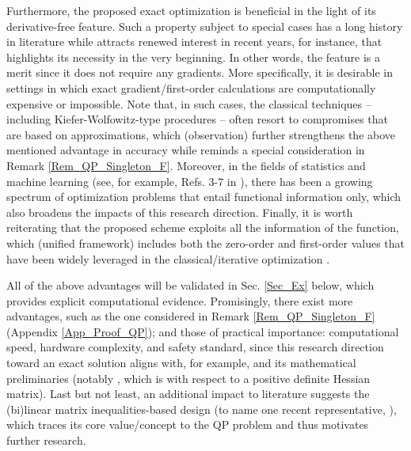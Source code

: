 \documentclass[9pt,twocolumn,twoside,lineno]{pnas-new-1}
\theoremstyle{remark}
\begin{document}
Furthermore, the proposed exact optimization is beneficial in the light of its derivative-free feature. Such a property subject to special cases has a long history in literature while attracts renewed interest in recent years, for instance, \cite{DuJoWaWi:15} that highlights its necessity in the very beginning. In other words, the feature is a merit since it does not require any gradients. More specifically, it is desirable in settings in which exact gradient/first-order calculations are computationally expensive or impossible. Note that, in such cases, the classical techniques -- including Kiefer-Wolfowitz-type procedures \citep{KuYi:03} -- often resort to compromises that are based on approximations, which (observation) further strengthens the above mentioned advantage in accuracy while reminds a special consideration in Remark \ref{Rem_QP_Singleton_F}. Moreover, in the fields of statistics and machine learning (see, for example, Refs. 3-7 in \cite{DuJoWaWi:15}), there has been a growing spectrum of optimization problems that entail functional information only, which also broadens the impacts of this research direction. Finally, it is worth reiterating that the proposed scheme exploits all the information of the function, which (unified framework) includes both the zero-order \citep{DuJoWaWi:15} and first-order values that have been widely leveraged in the classical/iterative optimization \citep{Lu(Ye):03(16),NoWr:06}.

All of the above advantages will be validated in Sec. \ref{Sec_Ex} below, which provides explicit computational evidence. Promisingly, there exist more advantages, such as the one considered in Remark \ref{Rem_QP_Singleton_F} (Appendix \ref{App_Proof_QP}); and those of practical importance: computational speed, hardware complexity, and safety standard, since this research direction toward an exact solution aligns with, for example, \cite{JoFoTo:05} and its mathematical preliminaries (notably \cite{BeMoDuPi:02}, which is with respect to a positive definite Hessian matrix). Last but not least, an additional impact to literature suggests the (bi)linear matrix inequalities-based design (to name one recent representative, \cite{MiHa:acc}), which traces its core value/concept to the QP problem and thus motivates further research.
\end{document}

